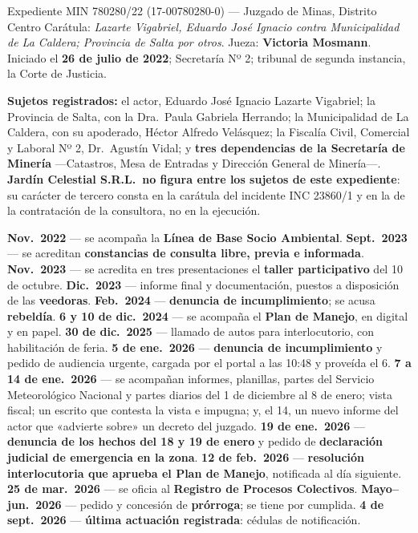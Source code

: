 \begin{ficha}{Expediente MIN 780280/22 (17-00780280-0) --- Juzgado de Minas, Distrito Centro}
Carátula: \textit{Lazarte Vigabriel, Eduardo José Ignacio contra Municipalidad de La Caldera;
Provincia de Salta por otros}. Jueza: \textbf{Victoria Mosmann}. Iniciado el \textbf{26 de julio de
2022}; Secretaría Nº 2; tribunal de segunda instancia, la Corte de Justicia.

\textbf{Sujetos registrados:} el actor, Eduardo José Ignacio Lazarte Vigabriel; la Provincia de
Salta, con la Dra.\ Paula Gabriela Herrando; la Municipalidad de La Caldera, con su apoderado,
Héctor Alfredo Velásquez; la Fiscalía Civil, Comercial y Laboral Nº 2, Dr.\ Agustín Vidal; y
\textbf{tres dependencias de la Secretaría de Minería} ---Catastros, Mesa de Entradas y Dirección
General de Minería---. \textbf{Jardín Celestial S.R.L.\ no figura entre los sujetos de este
expediente}: su carácter de tercero consta en la carátula del incidente INC 23860/1 y en la de
la contratación de la consultora, no en la ejecución.

\textbf{Nov.\ 2022} --- se acompaña la \textbf{Línea de Base Socio Ambiental}.
\textbf{Sept.\ 2023} --- se acreditan \textbf{constancias de consulta libre, previa e
informada}.
\textbf{Nov.\ 2023} --- se acredita en tres presentaciones el \textbf{taller participativo} del 10 de octubre.
\textbf{Dic.\ 2023} --- informe final y documentación, puestos a disposición de las
\textbf{veedoras}.
\textbf{Feb.\ 2024} --- \textbf{denuncia de incumplimiento}; se acusa \textbf{rebeldía}.
\textbf{6 y 10 de dic.\ 2024} --- se acompaña el \textbf{Plan de Manejo}, en digital y en
papel.
\textbf{30 de dic.\ 2025} --- llamado de autos para interlocutorio, con habilitación de feria.
\textbf{5 de ene.\ 2026} --- \textbf{denuncia de incumplimiento} y pedido de audiencia
urgente, cargada por el portal a las 10:48 y proveída el 6.
\textbf{7 a 14 de ene.\ 2026} --- se acompañan informes, planillas, partes del Servicio Meteorológico Nacional y partes diarios del 1 de diciembre al 8 de enero; vista fiscal; un escrito que contesta la vista e impugna; y, el 14, un nuevo informe del actor que «advierte sobre» un decreto del juzgado.
\textbf{19 de ene.\ 2026} --- \textbf{denuncia de los hechos del 18 y 19 de enero} y pedido de
\textbf{declaración judicial de emergencia en la zona}.
\textbf{12 de feb.\ 2026} --- \textbf{resolución interlocutoria que aprueba el Plan de Manejo},
notificada al día siguiente.
\textbf{25 de mar.\ 2026} --- se oficia al \textbf{Registro de Procesos Colectivos}.
\textbf{Mayo--jun.\ 2026} --- pedido y concesión de \textbf{prórroga}; se tiene por cumplida.
\textbf{4 de sept.\ 2026} --- \textbf{última actuación registrada}: cédulas de notificación.
\end{ficha}


